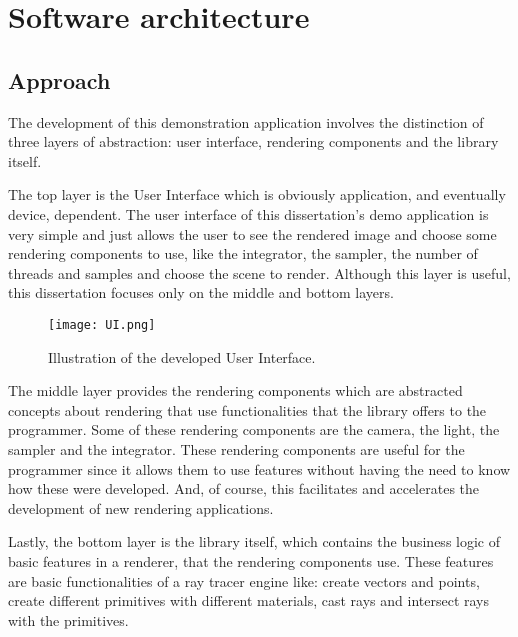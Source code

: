 \chapter{Software architecture}

\section{Approach}

\par
The development of this demonstration application involves the distinction of three layers of abstraction: user interface, rendering components and the library itself.

\par
The top layer is the User Interface which is obviously application, and eventually device, dependent.
The user interface of this dissertation's demo application is very simple and just allows the user to see the rendered image and choose some rendering components to use, like the integrator, the sampler, the number of threads and samples and choose the scene to render.
Although this layer is useful, this dissertation focuses only on the middle and bottom layers.

\begin{figure}[H]
	\centering
	\caption{Illustration of the developed User Interface.}
	\label{UI.}
	\texttt{[image: UI.png]}
\end{figure}

\par
The middle layer provides the rendering components which are abstracted concepts about rendering that use functionalities that the library offers to the programmer.
Some of these rendering components are the camera, the light, the sampler and the integrator.
These rendering components are useful for the programmer since it allows them to use features without having the need to know how these were developed.
And, of course, this facilitates and accelerates the development of new rendering applications.

\par
Lastly, the bottom layer is the library itself, which contains the business logic of basic features in a renderer, that the rendering components use.
These features are basic functionalities of a ray tracer engine like: create vectors and points, create different primitives with different materials, cast rays and intersect rays with the primitives.

